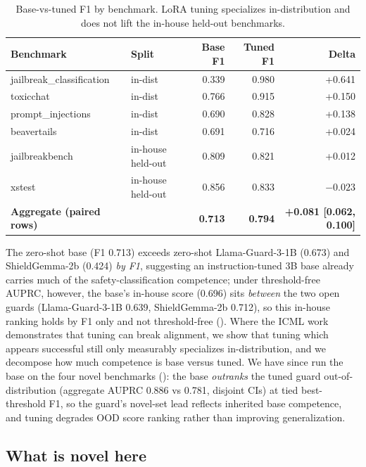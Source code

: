 \documentclass[sigconf,nonacm]{acmart}
\begin{document}
\begin{table}[t]
\centering
\small
\caption{Base-vs-tuned F1 by benchmark. LoRA tuning specializes in-distribution and does not lift the in-house held-out benchmarks.}
\label{tab:related-base-vs-tuned}
\begin{tabular}{llrrr}
\toprule
Benchmark & Split & Base F1 & Tuned F1 & Delta \\
\midrule
jailbreak\_classification & in-dist & 0.339 & 0.980 & +0.641 \\
toxicchat & in-dist & 0.766 & 0.915 & +0.150 \\
prompt\_injections & in-dist & 0.690 & 0.828 & +0.138 \\
beavertails & in-dist & 0.691 & 0.716 & +0.024 \\
jailbreakbench & in-house held-out & 0.809 & 0.821 & +0.012 \\
xstest & in-house held-out & 0.856 & 0.833 & $-0.023$ \\
\midrule
\textbf{Aggregate (paired rows)} & & \textbf{0.713} & \textbf{0.794} & \textbf{+0.081 [0.062, 0.100]} \\
\bottomrule
\end{tabular}
\end{table}

The zero-shot base (F1 0.713) exceeds zero-shot Llama-Guard-3-1B (0.673) and ShieldGemma-2b (0.424) \emph{by F1}, suggesting an instruction-tuned 3B base already carries much of the safety-classification competence; under threshold-free AUPRC, however, the base's in-house score (0.696) sits \emph{between} the two open guards (Llama-Guard-3-1B 0.639, ShieldGemma-2b 0.712), so this in-house ranking holds by F1 only and not threshold-free (). Where the ICML work demonstrates that tuning can break alignment, we show that tuning which appears successful still only measurably specializes in-distribution, and we decompose how much competence is base versus tuned. We have since run the base on the four novel benchmarks (): the base \emph{outranks} the tuned guard out-of-distribution (aggregate AUPRC 0.886 vs 0.781, disjoint CIs) at tied best-threshold F1, so the guard's novel-set lead reflects inherited base competence, and tuning degrades OOD score ranking rather than improving generalization.

\subsection{What is novel here}
\end{document}

